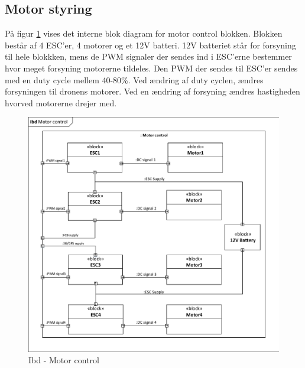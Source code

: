 \subsection{Motor styring}

På figur \ref{fig:ibd_motorcontrol} vises det interne blok diagram for motor control blokken. Blokken består af 4 ESC'er, 4 motorer og et 12V batteri. 12V batteriet står for forsyning til hele blokkken, mens de PWM signaler der sendes ind i ESC'erne bestemmer hvor meget forsyning motorerne tildeles. Den PWM der sendes til ESC'er sendes med en duty cycle mellem 40-80\%. Ved ændring af duty cyclen, ændres forsyningen til dronens motorer. Ved en ændring af forsyning ændres hastigheden hvorved motorerne drejer  med.

\begin{figure}[H]
\centering
\includegraphics[width=1\textwidth]{Billeder/IBD/ibd6_motorcontrol.pdf}
\vspace{-0.5cm}
\caption{Ibd - Motor control}
\label{fig:ibd_motorcontrol}
\end{figure}


